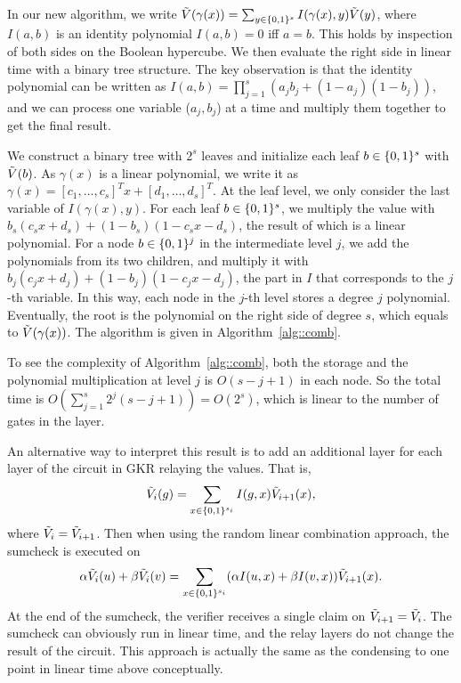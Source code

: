 In our new algorithm, we write $\tilde{V}(\gamma(x)) = \sum_{y\in\{0,1\}^s}I(\gamma(x), y)\tilde{V}(y)$, where $I(a,b)$ is an identity polynomial $I(a,b)=0$ iff $a=b$. This holds by inspection of both sides on the Boolean hypercube. We then evaluate the right side in linear time with a binary tree structure. The key observation is that the identity polynomial can be written as $I(a,b) = \prod_{j=1}^s (a_jb_j+(1-a_j)(1-b_j))$, and we can process one variable ($a_j,b_j$) at a time and multiply them together to get the final result. 

We construct a binary tree with $2^s$ leaves and initialize each leaf $b\in\{0,1\}^s$ with $\tilde{V}(b)$. As $\gamma(x)$ is a linear polynomial, we write it as $\gamma(x) = [c_1, \ldots, c_s]^T x+ [d_1, \ldots, d_s]^T$. At the leaf level, we only consider the last variable of $I(\gamma(x), y)$. For each leaf $b\in\{0,1\}^s$, we multiply the value with $b_s(c_s x+ d_s)+(1-b_s)(1-c_s x- d_s)$, the result of which is a linear polynomial. For a node $b\in\{0,1\}^j$ in the intermediate level $j$, we add the polynomials from its two children, and multiply it with $b_j(c_j x+ d_j)+(1-b_j)(1-c_j x- d_j)$, the part in $I$ that corresponds to the $j$-th variable. In this way, each node in the $j$-th level stores a degree $j$ polynomial. Eventually, the root is the polynomial on the right side of degree $s$, which equals to $\tilde{V}(\gamma(x))$. The algorithm is given in Algorithm~\ref{alg::comb}. 

To see the complexity of Algorithm~\ref{alg::comb}, both the storage and the polynomial multiplication at level $j$ is $O(s-j+1)$ in each node. So the total time is $O(\sum_{j=1}^s 2^j (s-j+1)) = O(2^s)$, which is linear to the number of gates in the layer.

An alternative way to interpret this result is to add an additional layer for each layer of the circuit in GKR relaying the values. That is, $$\tilde{V}_{i}(g) = \sum_{x\in\{0,1\}^{s_i}}I(g,x)\tilde{V}_{i+1}(x),$$ where $\tilde{V}_i = \tilde{V}_{i+1}$. Then when using the random linear combination approach, the sumcheck is executed on $$\alpha\tilde{V}_{i}(u)+\beta\tilde{V}_i(v) = \sum_{x\in\{0,1\}^{s_i}}(\alpha I(u,x)+\beta I(v,x))\tilde{V}_{i+1}(x).$$
At the end of the sumcheck, the verifier receives a single claim on $\tilde{V}_{i+1} = \tilde{V}_{i}$. The sumcheck can obviously run in linear time, and the relay layers do not change the result of the circuit. This approach is actually the same as the condensing to one point in linear time above conceptually. 




